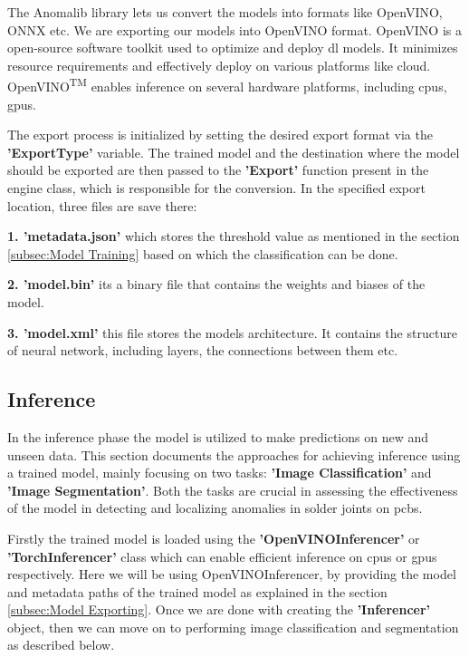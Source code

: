 The Anomalib library lets us convert the models into formats like OpenVINO, ONNX etc. We are exporting our models into OpenVINO format. OpenVINO is a open-source software toolkit used to optimize and deploy \gls{dl} models. It minimizes resource requirements and effectively deploy on various platforms like cloud. OpenVINO\textsuperscript{TM} enables inference on several hardware platforms, including \glspl{cpu}, \glspl{gpu}.\cite{openvino2024}

The export process is initialized by setting the desired export format via the \textbf{'ExportType'} variable. The trained model and the destination where the model should be exported are then passed to the \textbf{'Export'} function present in the engine class, which is responsible for the conversion. In the specified export location, three files are save there:

\textbf{1. 'metadata.json'} which stores the threshold value as mentioned in the section \ref{subsec:Model Training} based on which the classification can be done.

\textbf{2. 'model.bin'} its a binary file that contains the weights and biases of the model.

\textbf{3. 'model.xml'} this file stores the models architecture. It contains the structure of neural network, including layers, the connections between them etc.

\subsection{Inference}
\label{subsec:Inference}

In the inference phase the model is utilized to make predictions on new and unseen data. This section documents the approaches for achieving inference using a trained model, mainly focusing on two tasks: \textbf{'Image Classification'} and \textbf{'Image Segmentation'}. Both the tasks are crucial in assessing the effectiveness of the model in detecting and localizing anomalies in solder joints on \glspl{pcb}.

Firstly the trained model is loaded using the \textbf{'OpenVINOInferencer'} or \textbf{'TorchInferencer'} class which can enable efficient inference on \glspl{cpu} or \glspl{gpu} respectively. Here we will be using OpenVINOInferencer, by providing the model and metadata paths of the trained model as explained in the section \ref{subsec:Model Exporting}. Once we are done with creating the \textbf{'Inferencer'} object, then we can move on to performing image classification and segmentation as described below.

